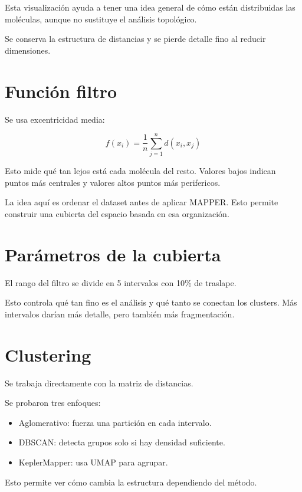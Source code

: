 \documentclass[12pt]{article}
\begin{document}
Esta visualización ayuda a tener una idea general de cómo están distribuidas las moléculas, aunque no sustituye el análisis topológico.

Se conserva la estructura de distancias y se pierde detalle fino al reducir dimensiones.

\section{Funci\'on filtro}

Se usa excentricidad media:

\[
f(x_i) = \frac{1}{n} \sum_{j=1}^{n} d(x_i, x_j)
\]

Esto mide qué tan lejos está cada molécula del resto. Valores bajos indican puntos más centrales y valores altos puntos más perifericos.

La idea aquí es ordenar el dataset antes de aplicar MAPPER. Esto permite construir una cubierta del espacio basada en esa organización.

\section{Par\'ametros de la cubierta}

El rango del filtro se divide en 5 intervalos con 10\% de traslape.

Esto controla qué tan fino es el análisis y qué tanto se conectan los clusters. Más intervalos darían más detalle, pero también más fragmentación.

\section{Clustering}

Se trabaja directamente con la matriz de distancias.

Se probaron tres enfoques:

\begin{itemize}
    \item Aglomerativo: fuerza una partición en cada intervalo.
    \item DBSCAN: detecta grupos solo si hay densidad suficiente.
    \item KeplerMapper: usa UMAP para agrupar.
\end{itemize}

Esto permite ver cómo cambia la estructura dependiendo del método.
\end{document}

